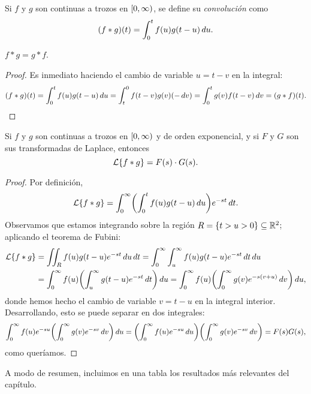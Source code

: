 \documentclass[../ecuaciones_diferenciales.tex]{subfiles}
\begin{document}
\begin{definition}
	Si \(f\) y \(g\) son continuas a trozos en \(\closedopen{0}{\infty}\), se define su
	\emph{convolución} como
	\[(f \ast g)(t) = \int_0^t f(u) g(t-u) \mathop{d\!} u.\]
\end{definition}

\begin{remark}
	\(f \ast g = g \ast f\).
	\begin{proof}
		Es inmediato haciendo el cambio de variable \(u = t-v\) en la integral:
		\[(f \ast g)(t) = \int_0^t f(u) g(t-u) \mathop{d\!} u = \int_t^0 f(t-v)g(v)
			(-\mathop{d\!} v) = \int_0^t g(v) f(t-v) \mathop{d\!} v = (g \ast f)(t).\]
	\end{proof}
\end{remark}

\begin{theorem}
	Si \(f\) y \(g\) son continuas a trozos en \(\closedopen{0}{\infty}\) y de orden
	exponencial, y si \(F\) y \(G\) son sus transformadas de Laplace, entonces
	\[\operatorname{\mathcal{L}}\{f \ast g\} = F(s) \cdot G(s).\]
	\begin{proof}
		Por definición,
		\[\laplace\{f \ast g\} = \int_0^\infty \left( \int_0^t f(u)g(t-u) \dif u \right)
			e^{-st} \dif t.\]
		Observamos que estamos integrando sobre la región \(R = \{t > u > 0\} \subseteq
		\mathbb{R}^2\); aplicando el teorema de Fubini:
		\begin{align*}
			\laplace\{f \ast g\}
			 & = \iint_R f(u) g(t-u) e^{-st} \dif u \dif t
			= \int_0^\infty \int_u^\infty f(u)g(t-u)e^{-st} \dif t \dif u            \\
			 & = \int_0^\infty f(u) \left(\int_u^\infty g(t-u)e^{-st} \dif t \right)
			\dif u = \int_0^\infty f(u) \left( \int_0^\infty g(v)e^{-s(v+u)} \dif v
			\right) \dif u,
		\end{align*}
		donde hemos hecho el cambio de variable \(v = t-u\) en la integral
		interior. Desarrollando, esto se puede separar en dos integrales:
		\[\int_0^\infty f(u) e^{-su} \left( \int_0^\infty g(v)e^{-sv} \dif v \right) \dif u
			= \left( \int_0^\infty f(u)e^{-su} \dif u \right)
			\left( \int_0^\infty g(v)e^{-sv} \dif v \right)
			= F(s) G(s),\]
		como queríamos.
	\end{proof}
\end{theorem}

A modo de resumen, incluimos en una tabla los resultados más relevantes del
capítulo.
\end{document}
